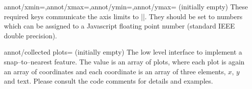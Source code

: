 \begin{pgfplotskeylist}{annot/xmin=,annot/xmax=,annot/ymin=,annot/ymax= (initially empty)}
	These required keys communicate the axis limits to |\pgfplotsclickablecreate|. They should be set to numbers which can be assigned to a Javascript floating point number (standard IEEE double precision).
\end{pgfplotskeylist}

\begin{pgfplotskey}{annot/collected plots= (initially empty)}
	The low level interface to implement a snap--to--nearest feature. The value is an array of plots, where each plot is again an array of coordinates and each coordinate is an array of three elements, $x$, $y$ and text. Please consult the code comments for details and examples.
\end{pgfplotskey}
\endgroup
